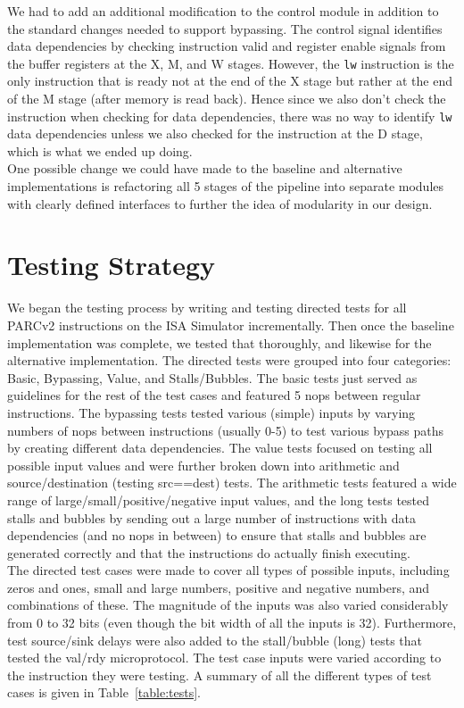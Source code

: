 \documentclass[10pt]{article}
\begin{document}
We had to add an additional modification to the control module in addition to the standard changes needed to support bypassing. The control signal identifies data dependencies by checking instruction valid and register enable signals from the buffer registers at the X, M, and W stages. However, the \texttt{lw} instruction is the only instruction that is ready not at the end of the X stage but rather at the end of the M stage (after memory is read back). Hence since we also don't check the instruction when checking for data dependencies, there was no way to identify \texttt{lw} data dependencies unless we also checked for the instruction at the D stage, which is what we ended up doing. \\

One possible change we could have made to the baseline and alternative implementations is refactoring all 5 stages of the pipeline into separate modules with clearly defined interfaces to further the idea of modularity in our design. 


\section{Testing Strategy}

We began the testing process by writing and testing directed tests for all PARCv2 instructions on the ISA Simulator incrementally. Then once the baseline implementation was complete, we tested that thoroughly, and likewise for the alternative implementation. The directed tests were grouped into four categories: Basic, Bypassing, Value, and Stalls/Bubbles. The basic tests just served as guidelines for the rest of the test cases and featured 5 nops between regular instructions. The bypassing tests tested various (simple) inputs by varying numbers of nops between instructions (usually 0-5) to test various bypass paths by creating different data dependencies. The value tests focused on testing all possible input values and were further broken down into arithmetic and source/destination (testing src==dest) tests. The arithmetic tests featured a wide range of large/small/positive/negative input values, and the long tests tested stalls and bubbles by sending out a large number of instructions with data dependencies (and no nops in between) to ensure that stalls and bubbles are generated correctly and that the instructions do actually finish executing. \\

The directed test cases were made to cover all types of possible inputs, including zeros and ones, small and large numbers, positive and negative numbers, and combinations of these. The magnitude of the inputs was also varied considerably from 0 to 32 bits (even though the bit width of all the inputs is 32). Furthermore, test source/sink delays were also added to the stall/bubble (long) tests that tested the val/rdy microprotocol. The test case inputs were varied according to the instruction they were testing. A summary of all the different types of test cases is given in Table~\ref{table:tests}. \\
\end{document}
